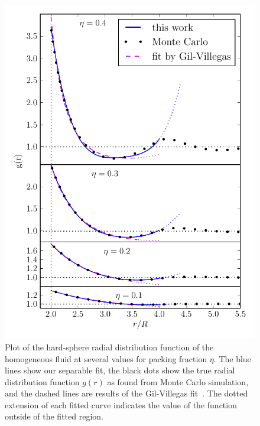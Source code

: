 \begin{figure}
  \centering
  \includegraphics[width=\columnwidth]{figs/short-range-ghs-alt}
  \caption{Plot of the hard-sphere radial distribution function of the
    homogeneous fluid at several values for packing fraction $\eta$. The
    blue lines show our separable fit, the black dots show the true
    radial distribution function $g(r)$ as found from Monte Carlo
    simulation, and the dashed lines are results of the
    Gil-Villegas fit~\cite{gil1997statistical}.  The dotted extension
    of each fitted curve indicates the value of the function outside
    of the fitted region.  }\label{fig:radial-distribution}
\end{figure}

